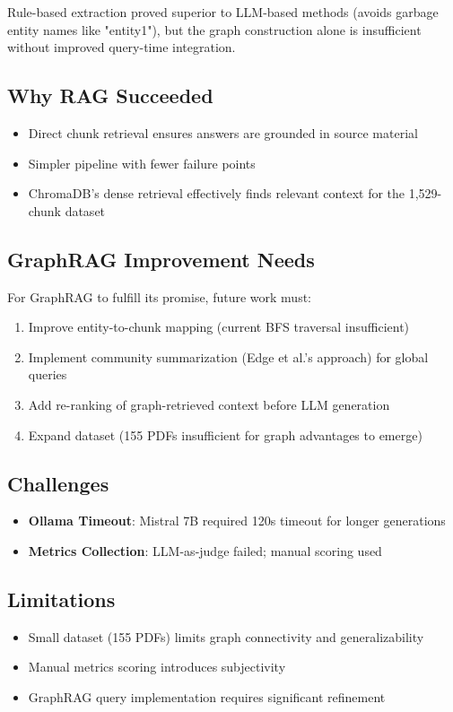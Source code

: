 \documentclass[conference]{IEEEtran}
\begin{document}
Rule-based extraction proved superior to LLM-based methods (avoids garbage entity names like "entity1"), but the graph construction alone is insufficient without improved query-time integration.

\subsection{Why RAG Succeeded}
\begin{itemize}
\item Direct chunk retrieval ensures answers are grounded in source material
\item Simpler pipeline with fewer failure points
\item ChromaDB's dense retrieval effectively finds relevant context for the 1,529-chunk dataset
\end{itemize}

\subsection{GraphRAG Improvement Needs}
For GraphRAG to fulfill its promise, future work must:
\begin{enumerate}
\item Improve entity-to-chunk mapping (current BFS traversal insufficient)
\item Implement community summarization (Edge et al.'s approach) for global queries
\item Add re-ranking of graph-retrieved context before LLM generation
\item Expand dataset (155 PDFs insufficient for graph advantages to emerge)
\end{enumerate}

\subsection{Challenges}
\begin{itemize}
\item \textbf{Ollama Timeout}: Mistral 7B required 120s timeout for longer generations
\item \textbf{Metrics Collection}: LLM-as-judge failed; manual scoring used
\end{itemize}

\subsection{Limitations}
\begin{itemize}
\item Small dataset (155 PDFs) limits graph connectivity and generalizability
\item Manual metrics scoring introduces subjectivity
\item GraphRAG query implementation requires significant refinement
\end{itemize}
\end{document}
